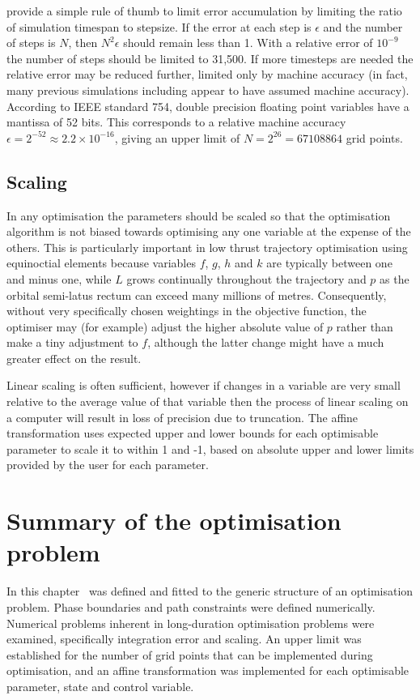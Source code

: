 \textcite{Milani1987} provide a simple rule of thumb to limit error accumulation by limiting the ratio of simulation timespan to stepsize. If the error at each step is $\epsilon$ and the number of steps is $N$, then $N^{2}\epsilon$ should remain less than 1. With a relative error of $10^{-9}$ the number of steps should be limited to 31,500. If more timesteps are needed the relative error may be reduced further, limited only by machine accuracy (in fact, many previous simulations including \citeauthor{Milani1987} appear to have assumed machine accuracy). According to IEEE standard 754, double precision floating point variables have a mantissa of 52 bits. This corresponds to a relative machine accuracy $\epsilon=2^{-52}\approx2.2\times10^{-16}$, giving an upper limit of $N=2^26=67108864$ grid points.

\subsection{Scaling} \label{sub:Scaling}

In any optimisation the parameters should be scaled so that the optimisation algorithm is not biased towards optimising any one variable at the expense of the others. This is particularly important in low thrust trajectory optimisation using equinoctial elements because variables $f$, $g$, $h$ and $k$ are typically between one and minus one, while $L$ grows continually throughout the trajectory and $p$ as the orbital semi-latus rectum can exceed many millions of metres. Consequently, without very specifically chosen weightings in the objective function, the optimiser may (for example) adjust the higher absolute value of $p$ rather than make a tiny adjustment to $f$, although the latter change might have a much greater effect on the result.

Linear scaling is often sufficient, however if changes in a variable are very small relative to the average value of that variable then the process of linear scaling on a computer will result in loss of precision due to truncation. The affine transformation \parencite{ASTOS_guide} uses expected upper and lower bounds for each optimisable parameter to scale it to within 1 and -1, based on absolute upper and lower limits provided by the user for each parameter.

\section{Summary of the optimisation problem} \label{sec:Optimisation-Summary}

In this chapter \BW\ was defined and fitted to the generic structure of an optimisation problem. Phase boundaries and path constraints were defined numerically. Numerical problems inherent in long-duration optimisation problems were examined, specifically integration error and scaling. An upper limit was established for the number of grid points that can be implemented during optimisation, and an affine transformation was implemented for each optimisable parameter, state and control variable. 
 
\clearpage
